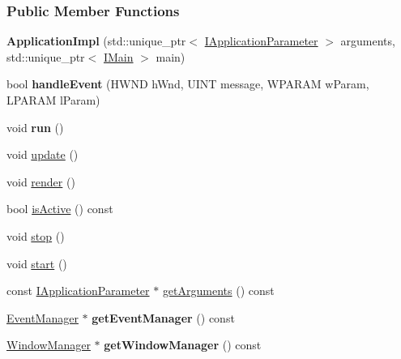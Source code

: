 \subsubsection*{Public Member Functions}
\begin{DoxyCompactItemize}
\item 
{\bfseries Application\+Impl} (std\+::unique\+\_\+ptr$<$ \hyperlink{a00043}{I\+Application\+Parameter} $>$ arguments, std\+::unique\+\_\+ptr$<$ \hyperlink{a00045}{I\+Main} $>$ main)\hypertarget{a00004_aae13a8664b4d94cf5a625eb526662599}{}\label{a00004_aae13a8664b4d94cf5a625eb526662599}

\item 
bool {\bfseries handle\+Event} (H\+W\+ND h\+Wnd, U\+I\+NT message, W\+P\+A\+R\+AM w\+Param, L\+P\+A\+R\+AM l\+Param)\hypertarget{a00004_a8622725348cb094eae90294be4896f66}{}\label{a00004_a8622725348cb094eae90294be4896f66}

\item 
void {\bfseries run} ()\hypertarget{a00002_a6d9c94380f1451664ff6d09c314671c7}{}\label{a00002_a6d9c94380f1451664ff6d09c314671c7}

\item 
void \hyperlink{a00002_a149822f20163e98d41728f4752d7a7f7}{update} ()
\item 
void \hyperlink{a00002_af3ef70b1c3e25be0dbe68c460ec2db98}{render} ()
\item 
bool \hyperlink{a00002_a86f249cf621c4255df1a60987c588961}{is\+Active} () const 
\item 
void \hyperlink{a00002_aeb61beceae055e7681b6791dd5dddafa}{stop} ()
\item 
void \hyperlink{a00002_a9b8b10fd48e93db0986df610523105dc}{start} ()
\item 
const \hyperlink{a00043}{I\+Application\+Parameter} $\ast$ \hyperlink{a00002_af165b483b86469ff9db2f689f1212f14}{get\+Arguments} () const 
\item 
\hyperlink{a00034}{Event\+Manager} $\ast$ {\bfseries get\+Event\+Manager} () const \hypertarget{a00002_aa895c5c2a56efe782cd9cb038075bb60}{}\label{a00002_aa895c5c2a56efe782cd9cb038075bb60}

\item 
\hyperlink{a00087}{Window\+Manager} $\ast$ {\bfseries get\+Window\+Manager} () const \hypertarget{a00002_aed35eca596bce4c089aa3db72d3dc5b6}{}\label{a00002_aed35eca596bce4c089aa3db72d3dc5b6}

\end{DoxyCompactItemize}


